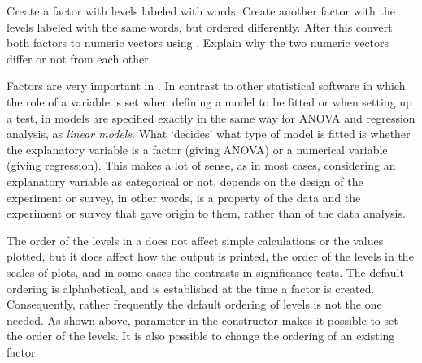 \documentclass[krantz2]{krantz}\usepackage{knitr}%
\begin{document}
\begin{playground}
Create a factor with levels labeled with words. Create another factor with the levels labeled with the same words, but ordered differently. After this convert both factors to numeric vectors using . Explain why the two numeric vectors differ or not from each other.
\end{playground}

Factors are very important in \Rlang. In contrast to other statistical software in which the role of a variable is set when defining a model to be fitted or when setting up a test, in \Rlang models are specified exactly in the same way for ANOVA and regression analysis, as \emph{linear models}. What `decides' what type of model is fitted is whether the explanatory variable is a factor (giving ANOVA) or a numerical variable (giving regression). This makes a lot of sense, as in most cases, considering an explanatory variable as categorical or not, depends on the design of the experiment or survey, in other words, is a property of the data and the experiment or survey that gave origin to them, rather than of the data analysis.

The order of the levels in a  does not affect simple calculations or the values plotted, but it does affect how the output is printed, the order of the levels in the scales of plots, and in some cases the contrasts in significance tests. The default ordering is alphabetical, and is established at the time a factor is created. Consequently, rather frequently the default ordering of levels is not the one needed. As shown above, parameter  in the constructor makes it possible to set the order of the levels. It is also possible to change the ordering of an existing factor.
\end{document}
